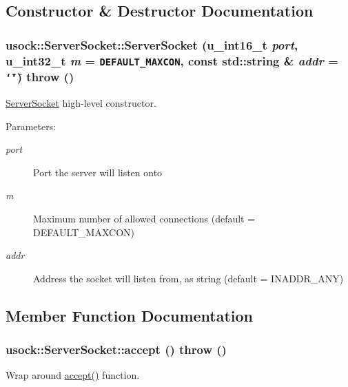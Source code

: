 \subsection{Constructor \& Destructor Documentation}
\hypertarget{classusock_1_1ServerSocket_0ac1908d4a4afb675715ae0ad994e870}{
\subsubsection[{ServerSocket}]{\setlength{\rightskip}{0pt plus 5cm}usock::ServerSocket::ServerSocket (u\_\-int16\_\-t {\em port}, \/  u\_\-int32\_\-t {\em m} = {\tt DEFAULT\_\-MAXCON}, \/  const std::string \& {\em addr} = {\tt \char`\"{}\char`\"{}})  throw ()}}
\label{classusock_1_1ServerSocket_0ac1908d4a4afb675715ae0ad994e870}


\hyperlink{classusock_1_1ServerSocket}{ServerSocket} high-level constructor. 

\begin{Desc}
\item[Parameters:]
\begin{description}
\item[{\em port}]Port the server will listen onto \item[{\em m}]Maximum number of allowed connections (default = DEFAULT\_\-MAXCON) \item[{\em addr}]Address the socket will listen from, as string (default = INADDR\_\-ANY) \end{description}
\end{Desc}


\subsection{Member Function Documentation}
\hypertarget{classusock_1_1ServerSocket_bf0477af52a725ced6afad86d7b3e794}{
\subsubsection[{accept}]{ usock::ServerSocket::accept ()  throw ()}}
\label{classusock_1_1ServerSocket_bf0477af52a725ced6afad86d7b3e794}


Wrap around \hyperlink{classusock_1_1ServerSocket_bf0477af52a725ced6afad86d7b3e794}{accept()} function. 


